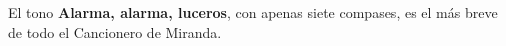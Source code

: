 El tono \textbf{Alarma, alarma, luceros}, con apenas siete compases, es el más breve de todo el Cancionero de Miranda.
